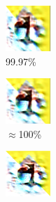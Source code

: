 \begin{enumerate}
\begin{figure}[!h]
\centering
\begin{subfigure}{.19\linewidth}
  \centering
  \includegraphics[width=0.7\linewidth]{imgs/robust_10/0_ll}
  \caption{99.97\%}
\end{subfigure}
\begin{subfigure}{.19\linewidth}
  \centering
  \includegraphics[width=0.7\linewidth]{imgs/robust_10/1_l}
  \caption{$\approx$100\%}
\end{subfigure}
\begin{subfigure}{.19\linewidth}
  \centering
  \includegraphics[width=0.7\linewidth]{imgs/robust_10/2_c}

\end{subfigure}
\end{figure}
\end{enumerate}
